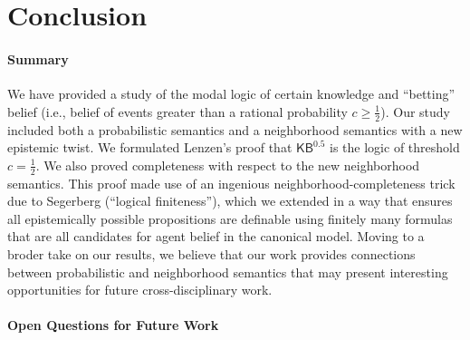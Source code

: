 \documentclass[12pt]{article}
\theoremstyle{definition}
\newcommand{\KBeq}{{\mathsf{KB}^{\mathsf{0.5}}}}       %
\begin{document}
\section{Conclusion} 
\label{SectionFRW}

\paragraph{Summary}

We have provided a study of the modal logic of certain knowledge and
``betting'' belief (i.e., belief of events greater than a rational
probability $c\geq\frac 12$).  Our study included both a probabilistic
semantics and a neighborhood semantics with a new epistemic twist.  We
formulated Lenzen's proof that $\KBeq$ is the logic of threshold
$c=\frac 12$.  We also proved completeness with respect to the new
neighborhood semantics.  This proof made use of an ingenious
neighborhood-completeness trick due to Segerberg (``logical
finiteness''), which we extended in a way that ensures all
epistemically possible propositions are definable using finitely many
formulas that are all candidates for agent belief in the canonical
model. Moving to a broder take on our results, we believe that our
work provides connections between probabilistic and neighborhood
semantics that may present interesting opportunities for future
cross-disciplinary work.

\paragraph{Open Questions for Future Work}
\end{document}
